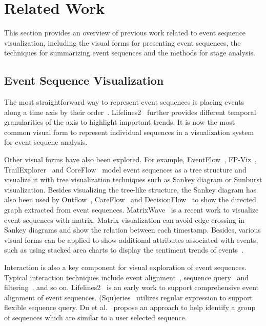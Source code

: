 \section{Related Work}
\label{section:relatedwork}

This section provides an overview of previous work related to event sequence visualization, including the visual forms for presenting event sequences, the techniques for summarizing event sequences and the methods for stage analysis.

\subsection{Event Sequence Visualization}

The most straightforward way to represent event sequences is placing events along a time axis by their order~\cite{plaisant1996lifelines,cloudlines11,zhao2013timeslice}. Lifelines2~\cite{wang2009temporal} further provides different temporal granularities of the axis to highlight important trends. It is now the most common visual form to represent individual sequences in a visualization system for event sequene analysis.

Other visual forms have also been explored. For example, EventFlow~\cite{wongsuphasawat2011lifeflow, monroe2013temporal}, FP-Viz~\cite{stasko2000focus+}, TrailExplorer~\cite{shen2010trail, shen2012visual} and CoreFlow~\cite{liu2017coreflow} model event sequences as a tree structure and visualize it with tree visualization techniques such as Sankey diagram or Sunburst visualization. Besides visualizing the tree-like structure, the Sankey diagram has also been used by Outflow~\cite{wongsuphasawat2012outflow}, CareFlow~\cite{perer2013data} and  DecisionFlow~\cite{gotz2014decisionflow} to show the directed graph extracted from event sequences. MatrixWave~\cite{zhao2015matrixwave} is a recent work to visualize event sequences with matrix. Matrix visualization can avoid edge crossing in Sankey diagrams and show the relation between each timestamp. Besides, various visual forms can be applied to show additional attributes associated with events, such as using stacked area charts to display the sentiment trends of events~\cite{lu2016exploring}.

Interaction is also a key component for visual exploration of event sequences. Typical interaction techniques include event alignment~\cite{wang2008aligning,wang2009temporal}, sequence query~\cite{zgraggen2015s,krause2016supporting,gotz2014decisionflow} and filtering~\cite{wongsuphasawat2009finding,du2016eventaction,du2016tvcg}, and so on. Lifelines2~\cite{wang2008aligning,wang2009temporal} is an early work to support comprehensive event alignment of event sequences. (S\textbar qu)eries~\cite{zgraggen2015s} utilizes regular expression to support flexible sequence query. Du et al.~\cite{du2016eventaction} propose an approach to help identify a group of sequences which are similar to a user selected sequence. 

